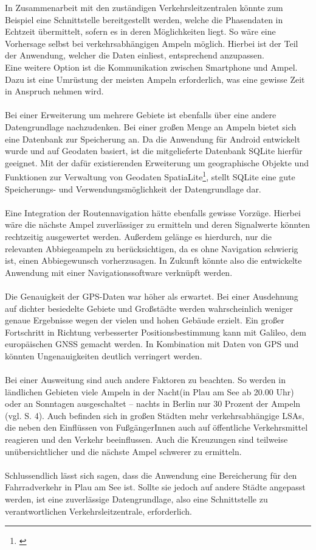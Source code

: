 In Zusammenarbeit mit den zuständigen Verkehrsleitzentralen könnte zum Beispiel eine Schnittstelle bereitgestellt werden, welche die Phasendaten in Echtzeit übermittelt, sofern es in deren Möglichkeiten liegt. So wäre eine Vorhersage selbst bei verkehrsabhängigen Ampeln möglich. Hierbei ist der Teil der Anwendung, welcher die Daten einliest, entsprechend anzupassen.\\
Eine weitere Option ist die Kommunikation zwischen \gls{Smartphone} und Ampel. Dazu ist eine Umrüstung der meisten Ampeln erforderlich, was eine gewisse Zeit in Anspruch nehmen wird. \cite{smart_lsa}\\\\
Bei einer Erweiterung um mehrere Gebiete ist ebenfalls über eine andere Datengrundlage nachzudenken. Bei einer großen Menge an Ampeln bietet sich eine Datenbank zur Speicherung an.
Da die Anwendung für Android entwickelt wurde und auf Geodaten basiert, ist die mitgelieferte Datenbank SQLite hierfür geeignet. Mit der dafür existierenden Erweiterung um geographische Objekte und Funktionen zur Verwaltung von Geodaten SpatiaLite\footnote{\cite{sparta}}, stellt SQLite eine gute Speicherungs- und Verwendungsmöglichkeit der Datengrundlage dar.\\\\
Eine Integration der Routennavigation hätte ebenfalls gewisse Vorzüge. Hierbei wäre die nächste Ampel zuverlässiger zu ermitteln und deren Signalwerte könnten rechtzeitig ausgewertet werden. Außerdem gelänge es hierdurch, nur die relevanten Abbiegeampeln zu berücksichtigen, da es ohne Navigation schwierig ist, einen Abbiegewunsch vorherzusagen. In Zukunft könnte also die entwickelte Anwendung mit einer Navigationssoftware verknüpft werden.\\\\
Die Genauigkeit der \gls{GPS}-Daten war höher als erwartet. Bei einer Ausdehnung auf dichter besiedelte Gebiete und Großstädte werden wahrscheinlich weniger genaue Ergebnisse wegen der vielen und hohen Gebäude erzielt.
Ein großer Fortschritt in Richtung verbesserter Positionsbestimmung kann mit Galileo, dem europäischen \gls{GNSS} gemacht werden. In Kombination mit Daten von \gls{GPS} und  könnten Ungenauigkeiten deutlich verringert werden. \cite{gnss}\\\\
Bei einer Ausweitung sind auch andere Faktoren zu beachten. So werden in ländlichen Gebieten viele Ampeln in der Nacht(in Plau am See ab 20.00 Uhr) oder an Sonntagen ausgeschaltet -- nachts in Berlin nur 30 Prozent der Ampeln (vgl. \cite{lsa_bln} S. 4). Auch befinden sich in großen Städten mehr verkehrsabhängige \glspl{LSA}, die neben den Einflüssen von FußgängerInnen auch auf öffentliche Verkehrsmittel reagieren und den Verkehr beeinflussen. Auch die Kreuzungen sind teilweise unübersichtlicher und die nächste Ampel schwerer zu ermitteln.\\\\
Schlussendlich lässt sich sagen, dass die Anwendung eine Bereicherung für den Fahrradverkehr in Plau am See ist. Sollte sie jedoch auf andere Städte angepasst werden, ist eine zuverlässige Datengrundlage, also eine Schnittstelle zu verantwortlichen Verkehrsleitzentrale, erforderlich.
